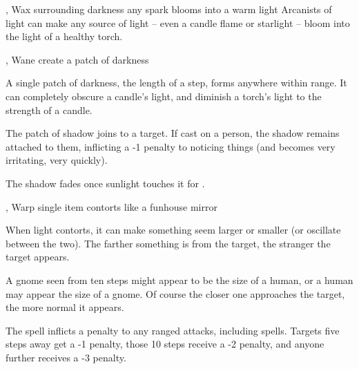   {\mFire, \mAir}%
  {Wax}%
  {}%
  {surrounding darkness}%
  {any spark blooms into a warm light}%
  {
    Arcanists of light can make any source of light -- even a candle flame or starlight -- bloom into the light of a healthy torch.
  }

  {\mFire, \mAir}%
  {Wane}%
  {}%
  {}%
  {create a patch of darkness}%
  {
    A single patch of darkness, the length of a step, forms anywhere within range.
    It can completely obscure a candle's light, and diminish a torch's light to the strength of a candle.

    The patch of shadow joins to a target.
    If cast on a person, the shadow remains attached to them, inflicting a -1 penalty to noticing things (and becomes very irritating, very quickly).

    The shadow fades once sunlight touches it for .
  }

  {\mFire, \mAir}%
  {Warp}%
  {}%
  {}%
  {single item contorts like a funhouse mirror}%
  {
    When light contorts, it can make something seem larger or smaller (or oscillate between the two).
    The farther something is from the target, the stranger the target appears.

    A gnome seen from ten steps might appear to be the size of a human, or a human may appear the size of a gnome.
    Of course the closer one approaches the target, the more normal it appears.

    The spell inflicts a penalty to any ranged attacks, including spells.
    Targets five steps away get a -1 penalty, those 10 steps receive a -2 penalty, and anyone further receives a -3 penalty.
  }

